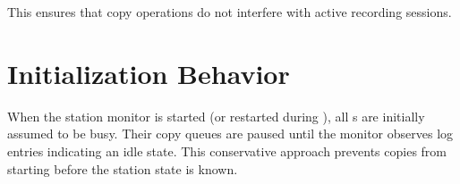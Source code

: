 This ensures that copy operations do not interfere with active recording sessions.

\section{Initialization Behavior}

When the station monitor is started (or restarted during ), all \DR{}s are initially assumed to be busy. Their copy queues are paused until the monitor observes log entries indicating an idle state. This conservative approach prevents copies from starting before the station state is known.
